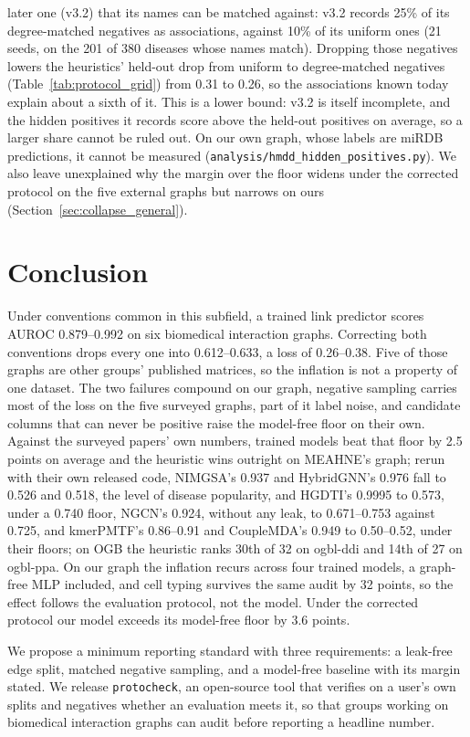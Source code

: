 \documentclass[review]{elsarticle}
\begin{document}
later one (v3.2) that its names can be matched against: v3.2 records 25\% of its degree-matched negatives as
associations, against 10\% of its uniform ones (21 seeds, on the 201 of 380 diseases whose names match).
Dropping those negatives lowers the heuristics' held-out drop from uniform to degree-matched negatives
(Table~\ref{tab:protocol_grid}) from 0.31 to 0.26, so the associations known today explain about a sixth of it.
This is a lower bound: v3.2 is itself incomplete, and the hidden positives it records score above the held-out
positives on average, so a larger share cannot be ruled out. On our own graph, whose labels are miRDB
predictions, it cannot be measured (\texttt{analysis/hmdd\_hidden\_positives.py}). We also leave unexplained why the margin over the floor widens under the corrected
protocol on the five external graphs but narrows on ours (Section~\ref{sec:collapse_general}).

\section{Conclusion}
\label{sec:conclusion}
Under conventions common in this subfield, a trained link predictor scores AUROC 0.879--0.992 on six
biomedical interaction graphs. Correcting both conventions drops every one into 0.612--0.633, a loss of
0.26--0.38. Five of those graphs are other groups' published matrices, so the inflation is not a property of
one dataset. The two failures compound on our graph, negative sampling carries most of the loss on the five
surveyed graphs, part of it label noise, and candidate columns that can never be positive raise the model-free floor on their own.
Against the surveyed papers' own numbers, trained models beat that floor by 2.5 points on average and the
heuristic wins outright on MEAHNE's graph; rerun with their own released code, NIMGSA's 0.937 and
HybridGNN's 0.976 fall to 0.526 and 0.518, the level of disease popularity, and HGDTI's 0.9995 to 0.573, under
a 0.740 floor, NGCN's 0.924, without any leak, to 0.671--0.753 against 0.725, and kmerPMTF's 0.86--0.91 and CoupleMDA's 0.949 to 0.50--0.52, under their floors; on OGB the heuristic ranks 30th of 32 on ogbl-ddi and 14th of 27 on ogbl-ppa.
On our graph the inflation recurs across four trained models, a graph-free MLP included, and
cell typing survives the same audit by 32 points, so the effect follows the evaluation protocol, not the model.
Under the corrected protocol our model exceeds its model-free floor by 3.6 points.

We propose a minimum reporting standard with three requirements: a leak-free edge split, matched negative
sampling, and a model-free baseline with its margin stated. We release \texttt{protocheck}, an open-source
tool that verifies on a user's own splits and negatives whether an evaluation meets it, so that groups working
on biomedical interaction graphs can audit before reporting a headline number.
\end{document}
